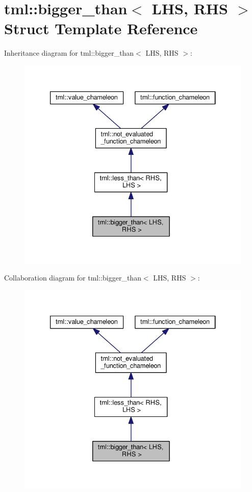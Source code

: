 \hypertarget{structtml_1_1bigger__than}{\section{tml\+:\+:bigger\+\_\+than$<$ L\+H\+S, R\+H\+S $>$ Struct Template Reference}
\label{structtml_1_1bigger__than}
}


Inheritance diagram for tml\+:\+:bigger\+\_\+than$<$ L\+H\+S, R\+H\+S $>$\+:
\nopagebreak
\begin{figure}[H]
\begin{center}
\leavevmode
\includegraphics[width=333pt]{structtml_1_1bigger__than__inherit__graph}
\end{center}
\end{figure}


Collaboration diagram for tml\+:\+:bigger\+\_\+than$<$ L\+H\+S, R\+H\+S $>$\+:
\nopagebreak
\begin{figure}[H]
\begin{center}
\leavevmode
\includegraphics[width=333pt]{structtml_1_1bigger__than__coll__graph}
\end{center}
\end{figure}
